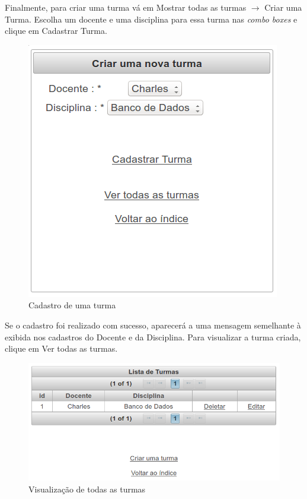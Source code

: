 \documentclass[12pt,a4paper]{article}
\begin{document}
Finalmente, para criar uma turma vá em Mostrar todas as turmas $\rightarrow$ Criar uma Turma. Escolha um docente e uma disciplina para essa turma nas \textit{combo boxes} e clique em Cadastrar Turma.

\begin{figure}[H]
    \centering
    \includegraphics[scale=0.45]{criarTurma.png}
    \caption{Cadastro de uma turma}
    \label{criarTurma}
\end{figure}

Se o cadastro foi realizado com sucesso, aparecerá a uma mensagem semelhante à exibida nos cadastros do Docente e da Disciplina. Para visualizar a turma criada, clique em Ver todas as turmas.

\begin{figure}[H]
    \centering
    \includegraphics[scale=0.45]{listTurma.png}
    \caption{Visualização de todas as turmas}
    \label{listTurma}
\end{figure}
\end{document}
